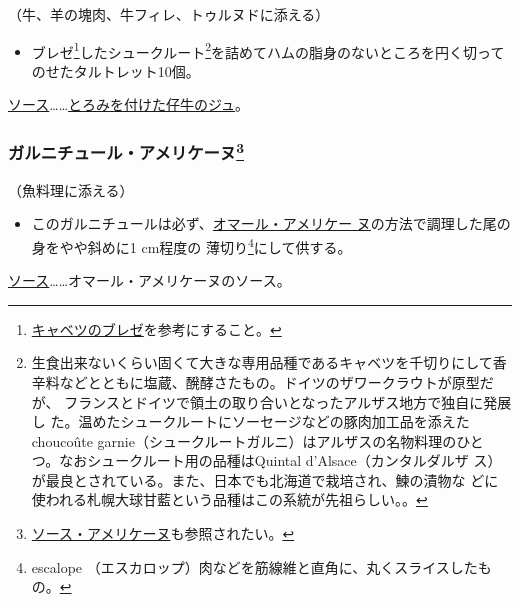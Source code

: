 \begin{recette}
（牛、羊の塊肉、牛フィレ、トゥルヌドに添える）

\begin{itemize}
\tightlist
\item
  ブレゼ\footnote{\protect\hyperlink{chou-braise}{キャベツのブレゼ}を参考にすること。}したシュークルート\footnote{生食出来ないくらい固くて大きな専用品種であるキャベツを千切りにして香
    辛料などとともに塩蔵、醗酵さたもの。ドイツのザワークラウトが原型だが、
    フランスとドイツで領土の取り合いとなったアルザス地方で独自に発展し
    た。温めたシュークルートにソーセージなどの豚肉加工品を添えた
    choucoûte garnie（シュークルートガルニ）はアルザスの名物料理のひと
    つ。なおシュークルート用の品種はQuintal d'Alsace（カンタルダルザ
    ス）が最良とされている。また、日本でも北海道で栽培され、鰊の漬物な
    どに使われる札幌大球甘藍という品種はこの系統が先祖らしい。。}を詰めてハムの脂身のないところを円く切ってのせたタルトレット10個。
\end{itemize}

\ul{ソース}\ldots{}\ldots{}\protect\hyperlink{jus-de-veau-lie}{とろみを付けた仔牛のジュ}。

\hypertarget{garniture-americaine}{%
\subsubsection[ガルニチュール・アメリケーヌ]{\texorpdfstring{ガルニチュール・アメリケーヌ\footnote{\protect\hyperlink{sauce-americaine}{ソース・アメリケーヌ}も参照されたい。}}{ガルニチュール・アメリケーヌ}}\label{garniture-americaine}}



（魚料理に添える）

\begin{itemize}
\tightlist
\item
  このガルニチュールは必ず、\protect\hyperlink{homard-americaine}{オマール・アメリケー
  ヌ}の方法で調理した尾の身をやや斜めに1 cm程度の 薄切り\footnote{escalope
    （エスカロップ）肉などを筋線維と直角に、丸くスライスしたもの。}にして供する。
\end{itemize}

\ul{ソース}\ldots{}\ldots{}オマール・アメリケーヌのソース。


\end{recette}
